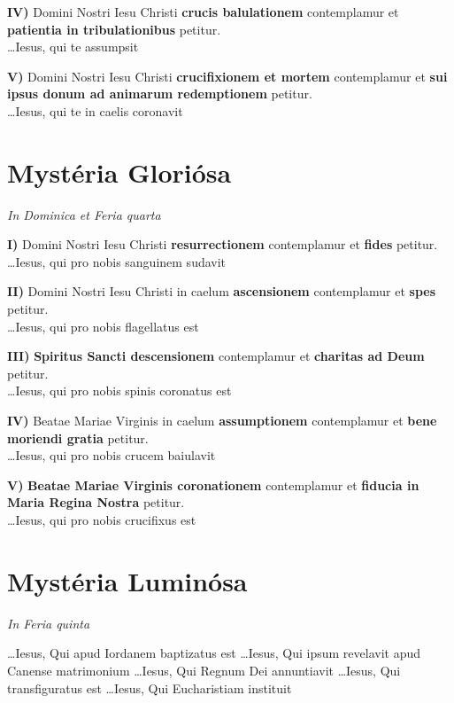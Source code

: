 \documentclass[paper=a5,pagesize=pdftex,fontsize=10pt,headinclude=on,twoside=off]{scrbook}
\newcommand{\mysterium}[1]{\textbf{#1}}
\newcommand{\fructum}[1]{\textbf{#1}}
\newcommand{\dies}[1]{\vspace{-0.6cm}\begin{center}\textit{\tiny#1}\end{center}\vspace{-0.1cm}}
\begin{document}
\textbf{IV)} Domini Nostri Iesu Christi \mysterium{crucis balulationem} contemplamur et \fructum{patientia in tribulationibus} petitur.\\
\ldots Iesus, qui te assumpsit

\textbf{V)} Domini Nostri Iesu Christi \mysterium{crucifixionem et mortem} contemplamur et \fructum{sui ipsus donum ad animarum redemptionem} petitur.\\
\ldots Iesus, qui te in caelis coronavit

\newpage 

\section{Mystéria Gloriósa}
\dies{In Dominica et Feria quarta}

\textbf{I)} Domini Nostri Iesu Christi \mysterium{resurrectionem} contemplamur et \fructum{fides} petitur.\\
\ldots Iesus, qui pro nobis sanguinem sudavit

\textbf{II)} Domini Nostri Iesu Christi in caelum \mysterium{ascensionem} contemplamur et \fructum{spes} petitur.\\
\ldots Iesus, qui pro nobis flagellatus est

\textbf{III)} \mysterium{Spiritus Sancti descensionem} contemplamur et \fructum{charitas ad Deum} petitur.\\
\ldots Iesus, qui pro nobis spinis coronatus est

\textbf{IV)} Beatae Mariae Virginis in caelum \mysterium{assumptionem} contemplamur et \fructum{bene moriendi gratia} petitur.\\
\ldots Iesus, qui pro nobis crucem baiulavit

\textbf{V)} \mysterium{Beatae Mariae Virginis coronationem} contemplamur et \fructum{fiducia in Maria Regina Nostra} petitur.\\
\ldots Iesus, qui pro nobis crucifixus est

\section{Mystéria Luminósa}
\dies{In Feria quinta}

\ldots Iesus, Qui apud Iordanem baptizatus est
\ldots Iesus, Qui ipsum revelavit apud Canense matrimonium
\ldots Iesus, Qui Regnum Dei annuntiavit
\ldots Iesus, Qui transfiguratus est 
\ldots Iesus, Qui Eucharistiam instituit

\newpage
\end{document}
